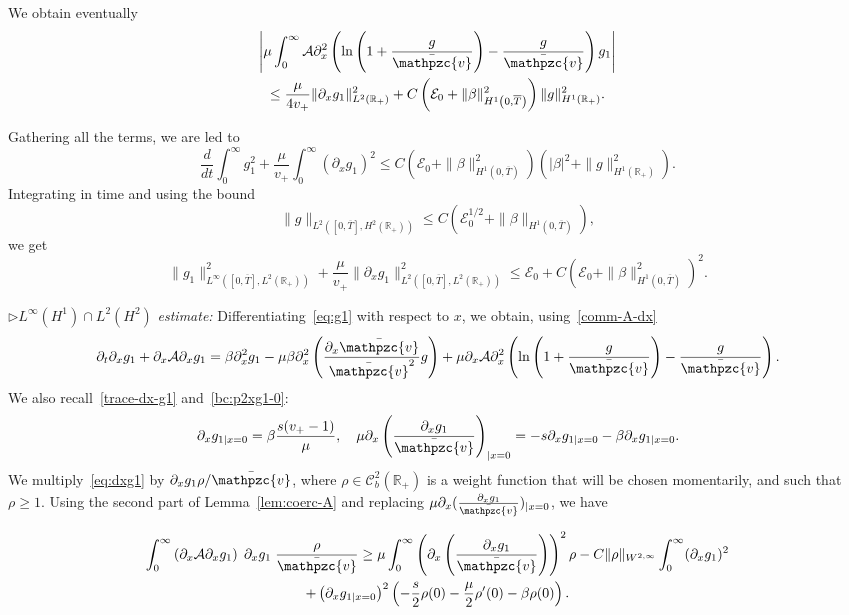 \documentclass[AHL,Unicode,longabstracts,published]{cedram}
\newcommand{\R}{\mathbb{R}}
\newcommand{\p}{\partial}
\newcommand{\bv}{\bar{\mathpzc{v}}}
\newcommand{\cA}{\mathcal A}
\newcommand{\cE}{\mathcal E}
\newcommand{\cC}{\mathcal C}
\begin{document}
\begin{itemize}
We obtain eventually
\begin{multline*}
\left| \mu \int_0^\infty\cA \p_x^2 \left(\ln\left(1+ \frac{g}{\bv}\right) - \frac{g}{\bv}\right) g_1\right|\\
\leq \frac{\mu}{4 v_+}\|\p_x g_1\|_{L^2(\R_+)}^2 + C \left(\cE_0 + \|\beta\|_{H^1\left(0, \overline{T}\right)}^2\right) \| g\|_{H^1(\R_+)}^2.
\end{multline*}
\end{itemize}
Gathering all the terms, we are led to
\[
\frac{d}{dt}\int_0^\infty g_1^2 + \frac{\mu}{v_+}\int_0^\infty (\p_x g_1)^2
\leq C\left(\cE_0 + \|\beta\|_{H^1\left(0, \overline{T}\right)}^2\right)\left(|\beta|^2 + \| g \|_{H^1(\R_+)}^2\right).
\]
Integrating in time and using the bound
\[
\|g\|_{L^2\left([0, \overline{T}], H^2(\R_+)\right)}\leq C\left(\cE_0^{1/2} + \|\beta\|_{H^1\left(0, \overline{T}\right)}\right),
\]
we get
\begin{equation}\label{borne-g1-L2H1}
\|g_1\|_{L^\infty\left([0,\overline{T}], L^2(\R_+)\right)}^2 + \frac{\mu}{v_+}\|\p_x g_1\|_{L^2\left([0,\overline{T}], L^2(\R_+)\right)}^2 \leq \cE_0 + C \left(\cE_0 + \|\beta\|_{H^1\left(0, \overline{T}\right)}^2\right)^2.
\end{equation}


$\rhd L^\infty(H^1)\cap L^2(H^2)$ \emph{estimate:} Differentiating~\eqref{eq:g1} with respect to $x$, we obtain, using~\eqref{comm-A-dx}
\begin{equation}\label{eq:dxg1}
\p_t \p_x g_1 + \p_x \cA \p_x g_1 = \beta \p_x^2 g_1 - \mu \beta \p_x^2\left(\frac{\p_x \bv}{\bv^2} g\right) + \mu \p_x \cA \p_x^2 \left(\ln\left(1+ \frac{g}{\bv}\right) - \frac{g}{\bv}\right).
\end{equation}
We also recall~\eqref{trace-dx-g1} and~\eqref{bc:p2xg1-0}:
\[
\p_x g_{1|x=0}= \beta \frac{s(v_+-1)}{\mu},\quad
\mu \p_x \left(\frac{\p_x g_1}{\bv}\right)_{|x=0} =- s \p_x g_{1|x=0} - \beta \p_x g_{1|x=0}.
\]
We multiply~\eqref{eq:dxg1} by $\p_x g_1 \rho/\bv $, where $\rho\in \cC^2_b(\R_+)$ is a weight function that will be chosen momentarily, and such that $\rho\geq 1$. Using the second part of Lemma~\ref{lem:coerc-A} and replacing $\mu \p_x (\frac{\p_x g_1}{\bv})_{|x=0}$, we have

\begin{multline*}
\int_0^\infty \left(\p_x \cA \p_x g_1\right) \;\p_x g_1 \; \frac{\rho}{\bv } \geq \mu \int_0^\infty \left(\p_x \left(\frac{\p_x g_1}{\bv}\right)\right)^2 \rho - C \|\rho\|_{W^{2,\infty}}\int_0^\infty (\p_x g_1)^2\\
+ \left(\p_x g_{1|x=0}\right)^2 \left(-\frac{s}{2} \rho(0)- \frac{\mu}{2}\rho'(0) - \beta \rho(0)\right).
\end{multline*}
\end{document}
